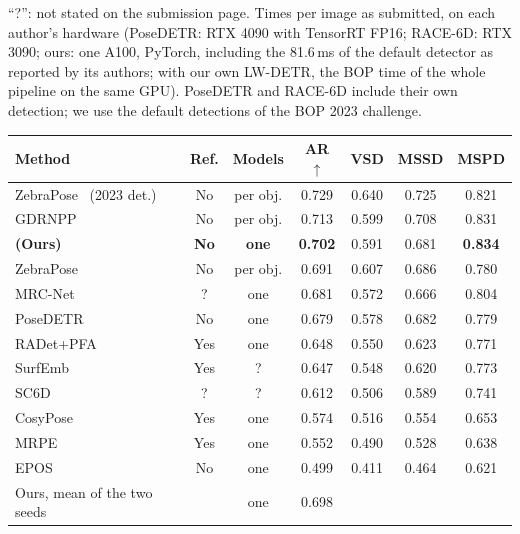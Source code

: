 \begin{table}[t]
{  ``?'': not stated on the submission page. Times per image as submitted, on each author's
  hardware (PoseDETR: RTX 4090 with TensorRT FP16; RACE-6D: RTX 3090; ours: one A100, PyTorch,
  including the 81.6\,ms of the default detector as reported by its authors; with our own
  LW-DETR, the BOP time of the whole pipeline on the same GPU). PoseDETR and RACE-6D
  include their own detection; we use the default detections of the BOP 2023 challenge.
  }
  \label{tab:lmo}
\end{table}

\begin{table}[t]
  \centering
  \setlength{\tabcolsep}{2.5pt}
  \footnotesize
  \begin{tabular}{lcccccc}
    \toprule
    Method & Ref. & Models & AR$\uparrow$ & VSD & MSSD & MSPD \\
    \midrule
    ZebraPose~\cite{su2022zebrapose} (2023 det.) & No & per obj. & 0.729 & 0.640 & 0.725 & 0.821 \\
    GDRNPP~\cite{liu2022gdrnpp} & No & per obj. & 0.713 & 0.599 & 0.708 & 0.831 \\
    \textbf{\ours{} (Ours)} & \textbf{No} & \textbf{one} & \textbf{0.702} & 0.591 & 0.681 & \textbf{0.834} \\
    ZebraPose~\cite{su2022zebrapose} & No & per obj. & 0.691 & 0.607 & 0.686 & 0.780 \\
    MRC-Net~\cite{li2024mrcnet} & ? & one & 0.681 & 0.572 & 0.666 & 0.804 \\
    PoseDETR~\cite{bop_posedetr} & No & one & 0.679 & 0.578 & 0.682 & 0.779 \\
    RADet+PFA~\cite{hai2023radet,hu2022pfa} & Yes & one & 0.648 & 0.550 & 0.623 & 0.771 \\
    SurfEmb~\cite{haugaard2022surfemb} & Yes & ? & 0.647 & 0.548 & 0.620 & 0.773 \\
    SC6D~\cite{cai2022sc6d} & ? & ? & 0.612 & 0.506 & 0.589 & 0.741 \\
    CosyPose~\cite{labbe2020cosypose} & Yes & one & 0.574 & 0.516 & 0.554 & 0.653 \\
    MRPE~\cite{bop_mrpe} & Yes & one & 0.552 & 0.490 & 0.528 & 0.638 \\
    EPOS~\cite{hodan2020epos} & No & one & 0.499 & 0.411 & 0.464 & 0.621 \\
    \midrule
    Ours, mean of the two seeds & & one & 0.698 & & & \\

\end{tabular}
\end{table}

